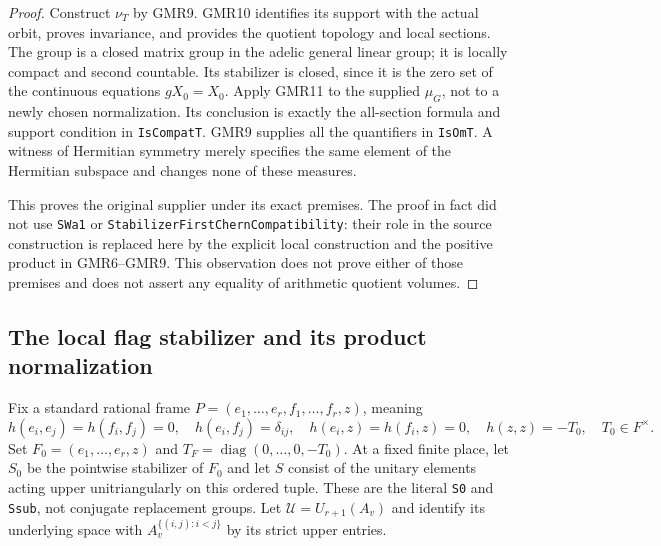 \begin{proof}
Construct $\nu_T$ by GMR9.  GMR10 identifies its support with the
actual orbit, proves invariance, and provides the quotient topology
and local sections.  The group is a closed matrix group in the
adelic general linear group; it is locally compact and second
countable.  Its stabilizer is closed, since it is the zero set of
the continuous equations $gX_0=X_0$.  Apply GMR11 to the supplied
$\mu_G$, not to a newly chosen normalization.  Its conclusion is
exactly the all-section formula and support condition in
\texttt{IsCompatT}.  GMR9 supplies all the quantifiers in
\texttt{IsOmT}.  A witness of Hermitian symmetry merely specifies
the same element of the Hermitian subspace and changes none of these
measures.

This proves the original supplier under its exact premises.
The proof in fact did not use \texttt{SWa1} or
\texttt{StabilizerFirstChernCompatibility}: their role in the source
construction is replaced here by the explicit local construction and
the positive product in GMR6--GMR9.  This observation does not prove
either of those premises and does not assert any equality of
arithmetic quotient volumes.
\end{proof}

\subsection{The local flag stabilizer and its product normalization}

Fix a standard rational frame
$P=(e_1,\ldots,e_r,f_1,\ldots,f_r,z)$, meaning
\[
 h(e_i,e_j)=h(f_i,f_j)=0,\quad h(e_i,f_j)=\delta_{ij},\quad
 h(e_i,z)=h(f_i,z)=0,\quad h(z,z)=-T_0,\quad T_0\in F^\times.
 \tag{GMR.21}
\]
Set $F_0=(e_1,\ldots,e_r,z)$ and
$T_F=\operatorname{diag}(0,\ldots,0,-T_0)$.
At a fixed finite place, let $S_0$ be the pointwise stabilizer of $F_0$
and let $S$ consist of the unitary elements acting upper
unitriangularly on this ordered tuple.  These are the literal
\texttt{S0} and \texttt{Ssub}, not conjugate replacement groups.
Let $\mathcal U=U_{r+1}(A_v)$ and identify its underlying space with
$A_v^{\{(i,j):i<j\}}$ by its strict upper entries.

